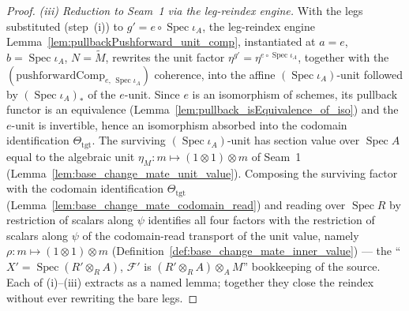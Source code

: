 \begin{proof}
  \emph{(iii) Reduction to Seam~1 via the leg-reindex engine.} With the legs substituted
  (step~(i)) to \(g' = e \circ \operatorname{Spec}\iota_A\), the leg-reindex engine
  Lemma~\ref{lem:pullbackPushforward_unit_comp}, instantiated at \(a = e\),
  \(b = \operatorname{Spec}\iota_A\), \(N = \widetilde M\), rewrites the unit factor
  \(\eta^{g'} = \eta^{e \circ \operatorname{Spec}\iota_A}\), together with the
  \((\mathrm{pushforwardComp}_{e,\,\operatorname{Spec}\iota_A})\) coherence, into the affine
  \((\operatorname{Spec}\iota_A)\)-unit followed by \((\operatorname{Spec}\iota_A)_{*}\) of the
  \(e\)-unit. Since \(e\) is an isomorphism of schemes, its pullback functor is an equivalence
  (Lemma~\ref{lem:pullback_isEquivalence_of_iso}) and the \(e\)-unit is invertible, hence an
  isomorphism absorbed into the codomain identification \(\Theta_{\mathrm{tgt}}\). The surviving
  \((\operatorname{Spec}\iota_A)\)-unit has section value over \(\operatorname{Spec} A\) equal to
  the algebraic unit \(\eta_M : m \mapsto (1 \otimes 1) \otimes m\) of Seam~1
  (Lemma~\ref{lem:base_change_mate_unit_value}). Composing the surviving factor with the
  codomain identification \(\Theta_{\mathrm{tgt}}\)
  (Lemma~\ref{lem:base_change_mate_codomain_read}) and reading over \(\operatorname{Spec} R\) by
  restriction of scalars along \(\psi\) identifies all four factors with the restriction of
  scalars along \(\psi\) of the codomain-read transport of the unit value, namely
  \(\rho : m \mapsto (1 \otimes 1) \otimes m\)
  (Definition~\ref{def:base_change_mate_inner_value}) — the
  ``\(X' = \operatorname{Spec}(R' \otimes_R A)\), \(\mathcal F'\) is
  \((R' \otimes_R A) \otimes_A M\)'' bookkeeping of the source. Each of (i)--(iii) extracts as a
  named lemma; together they close the reindex without ever rewriting the bare legs.
\end{proof}

